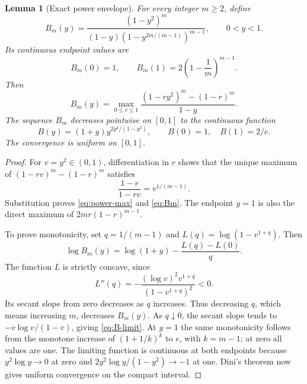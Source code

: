 \documentclass[11pt]{article}
\numberwithin{equation}{section}
\newtheorem{lemma}[theorem]{Lemma}
\theoremstyle{definition}
\theoremstyle{remark}
\begin{document}
\begin{lemma}[Exact power envelope]\label{lem:power-envelope}
For every integer $m\ge2$, define
\begin{equation}\label{eq:Bm}
 B_m(y)=\frac{(1-y^2)^m}
 {(1-y)(1-y^{2m/(m-1)})^{m-1}},\qquad 0<y<1.
\end{equation}
Its continuous endpoint values are
\[
 B_m(0)=1,\qquad B_m(1)=2\left(1-\frac1m\right)^{m-1}.
\]
Then
\begin{equation}\label{eq:power-max}
 B_m(y)=\max_{0\le r\le1}
 \frac{(1-ry^2)^m-(1-r)^m}{1-y}.
\end{equation}
The sequence $B_m$ decreases pointwise on $[0,1]$ to the continuous
function
\begin{equation}\label{eq:B-limit}
 B(y)=(1+y)y^{2y^2/(1-y^2)},\qquad B(0)=1,\quad B(1)=2/e.
\end{equation}
The convergence is uniform on $[0,1]$.
\end{lemma}
\begin{proof}
For $v=y^2\in(0,1)$, differentiation in $r$ shows that the unique
maximum of $(1-rv)^m-(1-r)^m$ satisfies
\[
 \frac{1-r}{1-rv}=v^{1/(m-1)}.
\]
Substitution proves \eqref{eq:power-max} and \eqref{eq:Bm}.
The endpoint $y=1$ is also the direct maximum of
$2mr(1-r)^{m-1}$.

To prove monotonicity, set $q=1/(m-1)$ and
$L(q)=\log(1-v^{1+q})$. Then
\[
 \log B_m(y)=\log(1+y)-\frac{L(q)-L(0)}q.
\]
The function $L$ is strictly concave, since
\[
 L''(q)=-\frac{(\log v)^2v^{1+q}}{(1-v^{1+q})^2}<0.
\]
Its secant slope from zero decreases as $q$ increases. Thus decreasing
$q$, which means increasing $m$, decreases $B_m(y)$.
As $q\downarrow0$, the secant slope tends to
$-v\log v/(1-v)$, giving \eqref{eq:B-limit}.
At $y=1$ the same monotonicity follows from the monotone increase of
$(1+1/k)^k$ to $e$, with $k=m-1$; at zero all values are one.
The limiting function is continuous at both endpoints because
$y^2\log y\to0$ at zero and
$2y^2\log y/(1-y^2)\to-1$ at one.
Dini's theorem now gives uniform convergence on the compact interval.
\end{proof}
\end{document}
